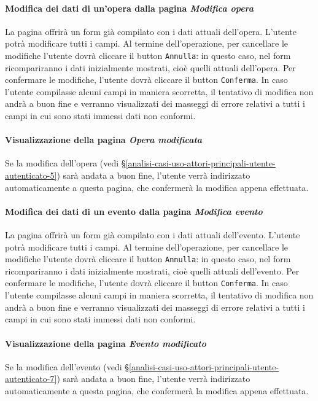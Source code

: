 \paragraph{Modifica dei dati di un'opera dalla pagina \textit{Modifica opera}}
\label{analisi-casi-uso-attori-principali-utente-amministratore-10}
La pagina offrirà un form già compilato con i dati attuali dell'opera. L'utente potrà modificare tutti i campi. Al termine dell'operazione, per cancellare le modifiche l'utente dovrà cliccare il button \texttt{Annulla}: in questo caso, nel form ricompariranno i dati inizialmente mostrati, cioè quelli attuali dell'opera. Per confermare le modifiche, l'utente dovrà cliccare il button \texttt{Conferma}. In caso l'utente compilasse alcuni campi in maniera scorretta, il tentativo di modifica non andrà a buon fine e verranno visualizzati dei masseggi di errore relativi a tutti i campi in cui sono stati immessi dati non conformi.


\paragraph{Visualizzazione della pagina \textit{Opera modificata}}
\label{analisi-casi-uso-attori-principali-utente-amministratore-11}
Se la modifica dell'opera (vedi §\ref{analisi-casi-uso-attori-principali-utente-autenticato-5}) sarà andata a buon fine, l'utente verrà indirizzato automaticamente a questa pagina, che confermerà la modifica appena effettuata.


\paragraph{Modifica dei dati di un evento dalla pagina \textit{Modifica evento}}
\label{analisi-casi-uso-attori-principali-utente-amministratore-12}
La pagina offrirà un form già compilato con i dati attuali dell'evento. L'utente potrà modificare tutti i campi. Al termine dell'operazione, per cancellare le modifiche l'utente dovrà cliccare il button \texttt{Annulla}: in questo caso, nel form ricompariranno i dati inizialmente mostrati, cioè quelli attuali dell'evento. Per confermare le modifiche, l'utente dovrà cliccare il button \texttt{Conferma}. In caso l'utente compilasse alcuni campi in maniera scorretta, il tentativo di modifica non andrà a buon fine e verranno visualizzati dei masseggi di errore relativi a tutti i campi in cui sono stati immessi dati non conformi.


\paragraph{Visualizzazione della pagina \textit{Evento modificato}}
\label{analisi-casi-uso-attori-principali-utente-amministratore-13}
Se la modifica dell'evento (vedi §\ref{analisi-casi-uso-attori-principali-utente-autenticato-7}) sarà andata a buon fine, l'utente verrà indirizzato automaticamente a questa pagina, che confermerà la modifica appena effettuata.



